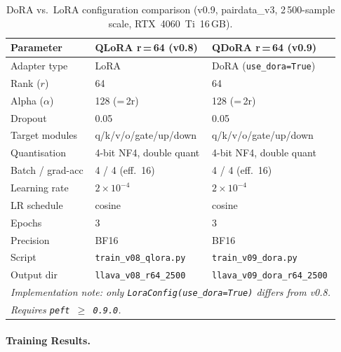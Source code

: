 \documentclass[onecolumn]{article}
\begin{document}
\begin{table}[h]
\centering
\caption{DoRA vs.\ LoRA configuration comparison
         (v0.9, pairdata\_v3, 2\,500-sample scale, RTX~4060~Ti~16\,GB).}
\label{tab:u8_config}
\small
\begin{tabular}{lll}
\toprule
\textbf{Parameter} & \textbf{QLoRA r\,=\,64 (v0.8)} & \textbf{QDoRA r\,=\,64 (v0.9)} \\
\midrule
Adapter type     & LoRA                 & DoRA (\texttt{use\_dora=True}) \\
Rank ($r$)       & 64                   & 64 \\
Alpha ($\alpha$) & 128 (=\,2r)          & 128 (=\,2r) \\
Dropout          & 0.05                 & 0.05 \\
Target modules   & q/k/v/o/gate/up/down & q/k/v/o/gate/up/down \\
Quantisation     & 4-bit NF4, double quant & 4-bit NF4, double quant \\
Batch / grad-acc & 4 / 4 (eff.\ 16)    & 4 / 4 (eff.\ 16) \\
Learning rate    & $2\times10^{-4}$     & $2\times10^{-4}$ \\
LR schedule      & cosine               & cosine \\
Epochs           & 3                    & 3 \\
Precision        & BF16                 & BF16 \\
Script           & \texttt{train\_v08\_qlora.py} & \texttt{train\_v09\_dora.py} \\
Output dir       & \texttt{llava\_v08\_r64\_2500} & \texttt{llava\_v09\_dora\_r64\_2500} \\
\midrule
\multicolumn{3}{l}{\textit{Implementation note: only \texttt{LoraConfig(use\_dora=True)} differs from v0.8.}} \\
\multicolumn{3}{l}{\textit{Requires \texttt{peft\,$\geq$\,0.9.0}.}} \\
\bottomrule
\end{tabular}
\end{table}

\paragraph{Training Results.}
\end{document}
